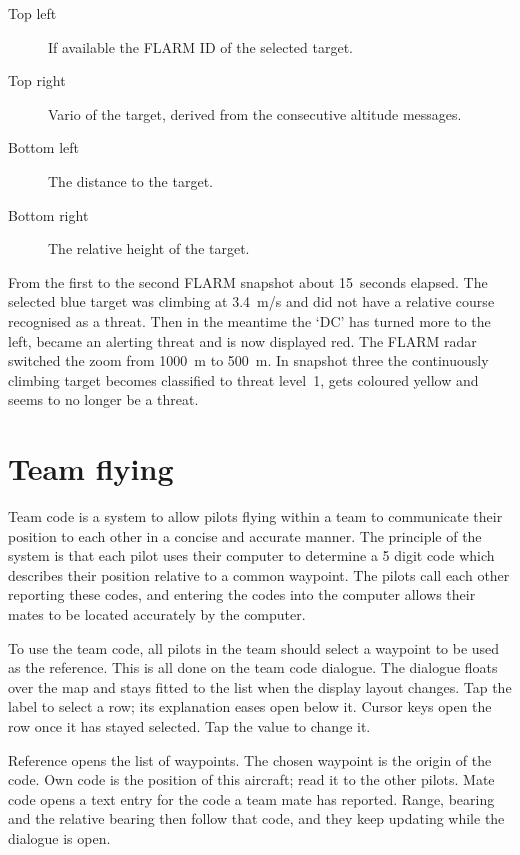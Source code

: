 \begin{description}
\item[Top left]  If available the FLARM ID of the selected target.
\item[Top right]  Vario of the target, derived from the consecutive altitude
messages.
\item[Bottom left]  The distance to the target.
\item[Bottom right]  The relative height of the target.
\end{description}

From the first to the second FLARM snapshot about 15~seconds elapsed. The
selected blue target was climbing at 3.4~m/s and did not have a relative course
recognised as a threat.  Then in the meantime the `DC' has turned more to
the left, became an alerting threat and is now displayed red.  The FLARM
radar switched the zoom from 1000~m to 500~m. In snapshot three the
continuously climbing target becomes classified to threat level~1, gets
coloured yellow and seems to no longer be a threat.


\section{Team flying}\label{sec:team-flying}

Team code is a system to allow pilots flying within a team to 
communicate their position to each other in a concise and accurate 
manner.  The principle of the system is that each pilot uses their 
computer to determine a 5 digit code which describes their position 
relative to a common waypoint.  The pilots call each other reporting 
these codes, and entering the codes into the computer allows their 
mates to be located accurately by the computer. 

To use the team code, all pilots in the team should select a waypoint to
be used as the reference.  This is all done on the team code dialogue.
The dialogue floats over the map and stays fitted to the list when the
display layout changes. Tap the label to select a row; its explanation
eases open below it. Cursor keys open the row once it has stayed
selected. Tap the value to change it.

Reference opens the list of waypoints. The chosen waypoint is the
origin of the code. Own code is the position of this aircraft; read it
to the other pilots. Mate code opens a text entry for the code a team
mate has reported. Range, bearing and the relative bearing then follow
that code, and they keep updating while the dialogue is open.

